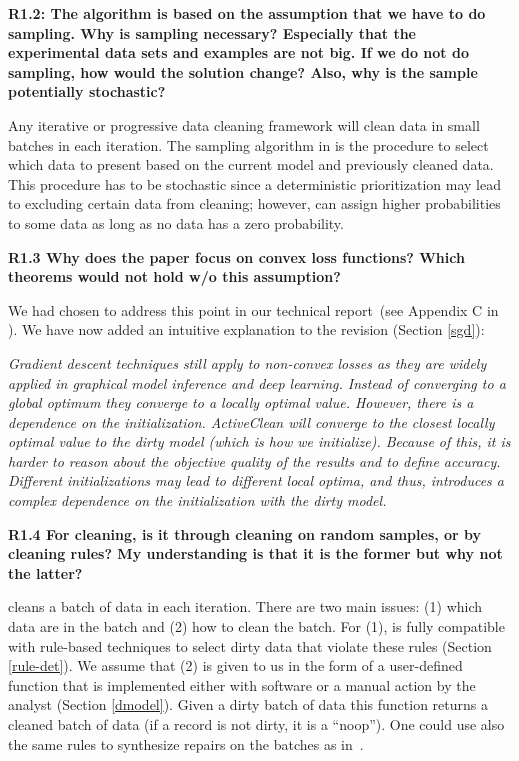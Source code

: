 \vspace{0.5em}

\noindent\textbf{R1.2: The algorithm is based on the assumption that we have to do sampling. Why is sampling necessary? Especially that the experimental data sets and examples are not big. If we do not do sampling, how would the solution change? Also, why is the sample potentially stochastic?}

\noindent Any iterative or progressive data cleaning framework will clean data in small batches in each iteration. 
The sampling algorithm in \sys is the procedure to select which data to present based on the current model and previously cleaned data.
This procedure has to be stochastic since a deterministic prioritization may lead to excluding certain data from cleaning; however, \sys can assign higher probabilities to some data as long as no data has a zero probability. 

\vspace{0.5em}

\noindent\textbf{R1.3 Why does the paper focus on convex loss functions? Which theorems would not hold w/o this assumption?}

\noindent We had chosen to address this point in our technical report~(see Appendix C in \cite{activecleanarxiv}). We have now added an intuitive explanation to the revision (Section \ref{sgd}):

\emph{Gradient descent techniques still apply to non-convex losses as they are widely applied in graphical model inference and deep learning. Instead of converging to a global optimum
they converge to a locally optimal value. However, there is a dependence on the initialization.
ActiveClean will converge to the closest locally optimal value to
the dirty model (which is how we initialize). Because of this, it is harder to reason about
the objective quality of the results and to define accuracy.
 Different initializations may lead to different local
optima, and thus, introduces a complex dependence on the
initialization with the dirty model.}

\vspace{0.5em}

\noindent\textbf{R1.4 For cleaning, is it through cleaning on random samples, or by cleaning rules? My understanding is that it is the former but why not the latter?}

\noindent \sys cleans a batch of data in each iteration. 
There are two main issues: (1) which data are in the batch and (2) how to clean the batch. 
For (1), \sys is fully compatible with rule-based techniques to select dirty data that violate these rules (Section \ref{rule-det}).
We assume that (2) is given to us in the form of a user-defined function that is implemented either with software or a manual action by the analyst (Section \ref{dmodel}). 
Given a dirty batch of data this function returns a cleaned batch of data (if a record is not dirty, it is a ``noop'').
One could use also the same rules to synthesize repairs on the batches as in~\cite{DBLP:journals/pvldb/YakoutENOI11}.

